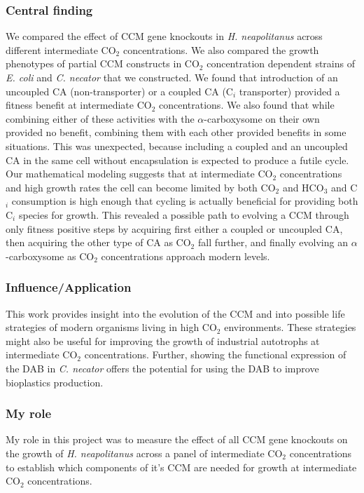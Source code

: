 \documentclass{article}
\begin{document}
\subsubsection{Central finding}
We compared the effect of CCM gene knockouts in \textit{H. neapolitanus} across different intermediate CO$_2$ concentrations.
We also compared the growth phenotypes of partial CCM constructs in CO$_2$ concentration dependent strains of \textit{E. coli} and \textit{C. necator} that we constructed.
We found that introduction of an uncoupled CA (non-transporter) or a coupled CA (C$_i$ transporter) provided a fitness benefit at intermediate CO$_2$ concentrations.
We also found that while combining either of these activities with the $\alpha$-carboxysome on their own provided no benefit, combining them with each other provided benefits in some situations. 
This was unexpected, because including a coupled and an uncoupled CA in the same cell without encapsulation is expected to produce a futile cycle.
Our mathematical modeling suggests that at intermediate CO$_2$ concentrations and high growth rates the cell can become limited by both CO$_2$ and HCO$_3$ and C$_i$ consumption is high enough that cycling is actually beneficial for providing both C$_i$ species for growth.
This revealed a possible path to evolving a CCM through only fitness positive steps by acquiring first either a coupled or uncoupled CA, then acquiring the other type of CA as CO$_2$ fall further, and finally evolving an $\alpha$-carboxysome as CO$_2$ concentrations approach modern levels.
%
\subsubsection{Influence/Application}
This work provides insight into the evolution of the CCM and into possible life strategies of modern organisms living in high CO$_2$ environments.
These strategies might also be useful for improving the growth of industrial autotrophs at intermediate CO$_2$ concentrations.
Further, showing the functional expression of the DAB in \textit{C. necator} offers the potential for using the DAB to improve bioplastics production.
%
\subsubsection{My role}
My role in this project was to measure the effect of all CCM gene knockouts on the growth of \textit{H. neapolitanus} across a panel of intermediate CO$_2$ concentrations to establish which components of it's CCM are needed for growth at intermediate CO$_2$ concentrations.
%
\nocite{Flamholz2022-yo}
\printbibliography[heading=none]
\end{document}
